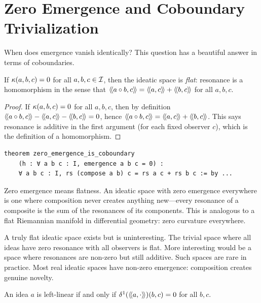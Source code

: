 \section{Zero Emergence and Coboundary Trivialization}

When does emergence vanish identically? This question has a beautiful answer
in terms of coboundaries.

\begin{theorem}
\label{thm:zero-emergence-coboundary}
If $\kappa(a,b,c) = 0$ for all $a, b, c \in \mathcal{I}$, then the ideatic space is
\emph{flat}: resonance is a homomorphism in the sense that $\langle\!\langle a \circ b, c \rangle\!\rangle
= \langle\!\langle a, c \rangle\!\rangle + \langle\!\langle b, c \rangle\!\rangle$ for all $a, b, c$.
\end{theorem}

\begin{proof}
If $\kappa(a,b,c) = 0$ for all $a,b,c$, then by definition
$\langle\!\langle a \circ b, c \rangle\!\rangle - \langle\!\langle a, c \rangle\!\rangle - \langle\!\langle b, c \rangle\!\rangle = 0$, hence
$\langle\!\langle a \circ b, c \rangle\!\rangle = \langle\!\langle a, c \rangle\!\rangle + \langle\!\langle b, c \rangle\!\rangle$. This says resonance is
additive in the first argument (for each fixed observer $c$), which is the
definition of a homomorphism.
\end{proof}

\begin{lstlisting}[caption={Zero emergence (IDT\_v3\_Emergence.lean)}]
theorem zero_emergence_is_coboundary
    (h : ∀ a b c : I, emergence a b c = 0) :
    ∀ a b c : I, rs (compose a b) c = rs a c + rs b c := by ...
\end{lstlisting}

\begin{interpretation}
Zero emergence means flatness. An ideatic space with zero emergence everywhere
is one where composition never creates anything new---every resonance of a
composite is the sum of the resonances of its components. This is analogous
to a flat Riemannian manifold in differential geometry: zero curvature everywhere.

A truly flat ideatic space exists but is uninteresting. The trivial space where
all ideas have zero resonance with all observers is flat. More interesting would
be a space where resonances are non-zero but still additive. Such spaces are
rare in practice. Most real ideatic spaces have non-zero emergence: composition
creates genuine novelty.
\end{interpretation}

\begin{theorem}
\label{thm:leftlinear-coboundary}
An idea $a$ is left-linear if and only if $\delta^1(\langle\!\langle a, \cdot \rangle\!\rangle)(b,c) = 0$
for all $b, c$.
\end{theorem}

